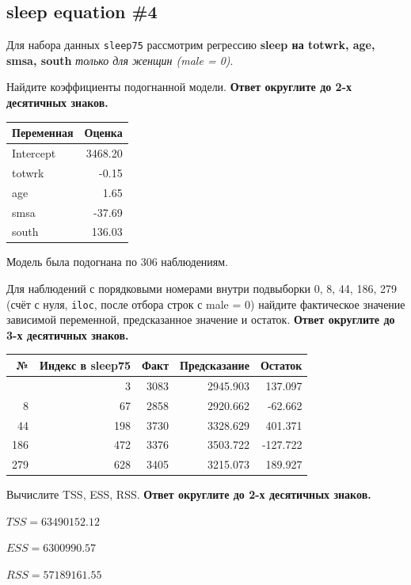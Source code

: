 \documentclass[
  russian,
]{article}
\newcounter{none} %
\begin{document}
\subsection{sleep equation \#4}\label{sleep-equation-4}

Для набора данных \texttt{sleep75} рассмотрим регрессию \textbf{sleep на
totwrk, age, smsa, south} \emph{только для женщин (male = 0)}.

Найдите коэффициенты подогнанной модели. \textbf{Ответ округлите до 2-х
десятичных знаков.}

{\def\LTcaptype{none} %
\begin{longtable}[]{@{}lr@{}}
\toprule\noalign{}
Переменная & Оценка \\
\midrule\noalign{}
\endhead
\bottomrule\noalign{}
\endlastfoot
Intercept & 3468.20 \\
totwrk & -0.15 \\
age & 1.65 \\
smsa & -37.69 \\
south & 136.03 \\
\end{longtable}
}

Модель была подогнана по 306 наблюдениям.

Для наблюдений с порядковыми номерами внутри подвыборки 0, 8, 44, 186,
279 (счёт с нуля, \texttt{iloc}, после отбора строк с male = 0) найдите
фактическое значение зависимой переменной, предсказанное значение и
остаток. \textbf{Ответ округлите до 3-х десятичных знаков.}

{\def\LTcaptype{none} %
\begin{longtable}[]{@{}rrrrr@{}}
\toprule\noalign{}
№ & Индекс в sleep75 & Факт & Предсказание & Остаток \\
\midrule\noalign{}
\endhead
\bottomrule\noalign{}
\endlastfoot
0 & 3 & 3083 & 2945.903 & 137.097 \\
8 & 67 & 2858 & 2920.662 & -62.662 \\
44 & 198 & 3730 & 3328.629 & 401.371 \\
186 & 472 & 3376 & 3503.722 & -127.722 \\
279 & 628 & 3405 & 3215.073 & 189.927 \\
\end{longtable}
}

Вычислите TSS, ESS, RSS. \textbf{Ответ округлите до 2-х десятичных
знаков.}

\begin{tcolorbox}[enhanced jigsaw, arc=.35mm, bottomrule=.15mm, bottomtitle=1mm, breakable, colback=white, colbacktitle=quarto-callout-note-color!10!white, colframe=quarto-callout-note-color-frame, coltitle=black, left=2mm, leftrule=.75mm, opacityback=0, opacitybacktitle=0.6, rightrule=.15mm, title=\textcolor{quarto-callout-note-color}{\faInfo}\hspace{0.5em}{Суммы квадратов}, titlerule=0mm, toprule=.15mm, toptitle=1mm]

\(TSS = 63490152.12\)

\(ESS = 6300990.57\)

\(RSS = 57189161.55\)

\end{tcolorbox}
\end{document}
